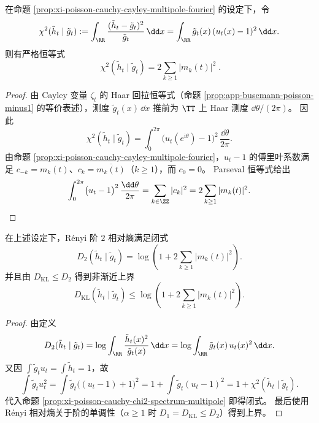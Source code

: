\begin{proposition}\label{prop:xi-poisson-cauchy-chi2-spectrum-multipole}
在命题 \ref{prop:xi-poisson-cauchy-cayley-multipole-fourier} 的设定下，令
\[
\chi^2(\tilde h_t\mid\tilde g_t)
:=\int_{\RR}\frac{(\tilde h_t-\tilde g_t)^2}{\tilde g_t}\,\dd x
=\int_{\RR}\tilde g_t(x)\,(u_t(x)-1)^2\,\dd x.
\]
则有严格恒等式
\[
\boxed{\;
\chi^2(\tilde h_t\mid\tilde g_t)=2\sum_{k\ge1}|m_k(t)|^2\; }.
\]
\end{proposition}
\begin{proof}
由 Cayley 变量 \(\zeta_t\) 的 Haar 回拉恒等式（命题 \ref{prop:app-busemann-poisson-minus1} 的等价表述），测度 \(\tilde g_t(x)\,\dd x\) 推前为 \(\TT\) 上 Haar 测度 \(\dd\theta/(2\pi)\)。
因此
\[
\chi^2(\tilde h_t\mid\tilde g_t)=\int_{0}^{2\pi}\bigl(u_t(e^{\mathrm{i}\theta})-1\bigr)^2\,\frac{\dd\theta}{2\pi}.
\]
由命题 \ref{prop:xi-poisson-cauchy-cayley-multipole-fourier}，\(u_t-1\) 的傅里叶系数满足 \(c_{-k}=m_k(t)\)、\(c_k=\overline{m_k(t)}\)（\(k\ge1\)），而 \(c_0=0\)。
Parseval 恒等式给出
\[
\int_{0}^{2\pi}\bigl(u_t-1\bigr)^2\,\frac{\dd\theta}{2\pi}
=\sum_{k\in\ZZ}|c_k|^2
=2\sum_{k\ge1}|m_k(t)|^2.
\]
\end{proof}

\begin{corollary}\label{cor:xi-poisson-cauchy-renyi2-kl-upper}
在上述设定下，Rényi 阶 \(2\) 相对熵满足闭式
\[
D_2(\tilde h_t\mid\tilde g_t)=\log\!\left(1+2\sum_{k\ge1}|m_k(t)|^2\right).
\]
并且由 \(D_{\mathrm{KL}}\le D_2\) 得到非渐近上界
\[
D_{\mathrm{KL}}(\tilde h_t\mid\tilde g_t)\le \log\!\left(1+2\sum_{k\ge1}|m_k(t)|^2\right).
\]
\end{corollary}
\begin{proof}
由定义
\[
D_2(\tilde h_t\mid\tilde g_t)=\log\int_{\RR}\frac{\tilde h_t(x)^2}{\tilde g_t(x)}\,\dd x
=\log\int_{\RR}\tilde g_t(x)\,u_t(x)^2\,\dd x.
\]
又因 \(\int \tilde g_t u_t=\int \tilde h_t=1\)，故
\[
\int \tilde g_t u_t^2
=\int \tilde g_t\bigl((u_t-1)+1\bigr)^2
=1+\int \tilde g_t(u_t-1)^2
=1+\chi^2(\tilde h_t\mid\tilde g_t).
\]
代入命题 \ref{prop:xi-poisson-cauchy-chi2-spectrum-multipole} 即得闭式。
最后使用 Rényi 相对熵关于阶的单调性（\(\alpha\ge1\) 时 \(D_1=D_{\mathrm{KL}}\le D_2\)）得到上界。
\end{proof}

